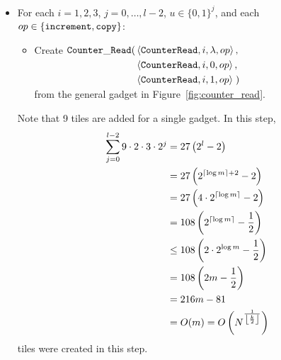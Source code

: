 \begin{itemize}
    \item For each $i = 1,2,3$,
                   $j = 0,\ldots,l-2$,
                   $u \in \{0, 1\}^j$, and each
                   $\inc \in \{{\tt increment}, {\tt copy} \}$:
    \begin{itemize}
        \item Create
        $\begin{aligned}[t]
            \cread(& \left\langle {\tt CounterRead}, i, \lambda, \inc \right\rangle, \\
                   & \left\langle {\tt CounterRead}, i, 0,       \inc \right\rangle, \\
                   & \left\langle {\tt CounterRead}, i, 1,       \inc \right\rangle \;)
        \end{aligned}$\\ from the general gadget in Figure~\ref{fig:counter_read}.
    \end{itemize}
    Note that 9 tiles are added for a single {\cread} gadget.
    In this step,
    \begin{align*}
        \sum_{j=0}^{l - 2} 9 \cdot 2 \cdot 3 \cdot 2^j &=    27 \left( 2^{l} - 2\right)\\
                                                       &=    27 \left( 2^{\ceil*{\log m} + 2} - 2 \right) \\
                                                       &=    27 \left(4 \cdot 2^{\ceil*{\log m}} - 2 \right) \\
                                                       &=    108 \left( 2^{\ceil*{\log m}} - \frac{1}{2} \right) \\
                                                       &\leq 108 \left(2 \cdot 2^{\log m} - \frac{1}{2} \right) \\
                                                       &=    108 \left(2m - \frac{1}{2} \right) \\
                                                       &=    216m - 81\\
                                                       &=    O(m) = O\left( \upperbound \right)\\
    \end{align*}
    tiles were created in this step.
\end{itemize}

